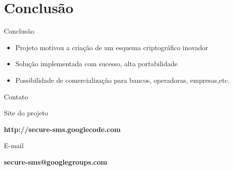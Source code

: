 \documentclass[notes,blue,mathserif]{beamer}
\begin{document}
\section{Conclus\~{a}o}

\begin{frame}{Conclus\~{a}o}

\begin{itemize}[<+->]
\item Projeto motivou a cria\c{c}\~{a}o de um esquema criptogr\'{a}fico inovador
\item Solu\c{c}\~{a}o implementada com sucesso, alta portabilidade
\item Possibilidade de comercializa\c{c}\~{a}o para bancos, operadoras, empresas,etc.
\end{itemize}

\end{frame}


\begin{frame}{Contato}

	\begin{exampleblock}{Site do projeto}
		\begin{center}
		\begin{large}

		\textbf{http://secure-sms.googlecode.com}

		\end{large}
		\end{center}
	\end{exampleblock}

	\begin{exampleblock}{E-mail}
		\begin{center}
		\begin{large}

		\textbf{secure-sms@googlegroups.com}

		\end{large}
		\end{center}
	\end{exampleblock}

\end{frame}
\end{document}
